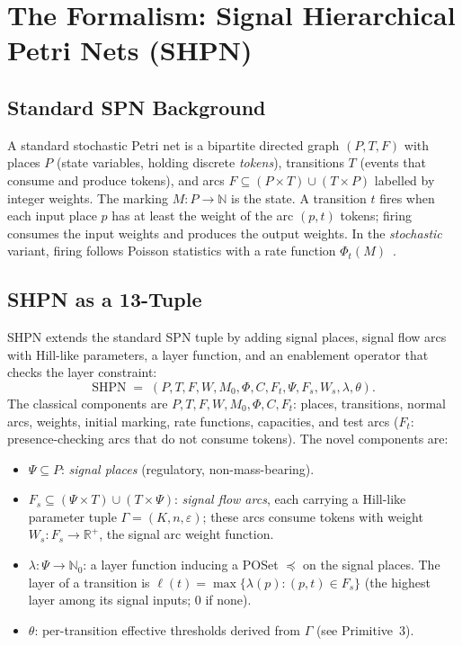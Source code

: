 \documentclass[11pt,a4paper]{article}
\begin{document}
\section{The Formalism: Signal Hierarchical Petri Nets (SHPN)}
\label{sec:formalism}

\subsection{Standard SPN Background}

A standard stochastic Petri net is a bipartite directed graph
\((P, T, F)\) with places \(P\) (state variables, holding discrete
\emph{tokens}), transitions \(T\) (events that consume and produce
tokens), and arcs \(F \subseteq (P\times T) \cup (T\times P)\) labelled
by integer weights.  The marking \(M : P \to \mathbb{N}\) is the
state.  A transition \(t\) fires when each input place \(p\) has at
least the weight of the arc \((p,t)\) tokens; firing consumes the
input weights and produces the output weights.  In the
\emph{stochastic} variant, firing follows Poisson statistics with a
rate function \(\Phi_t(M)\)~\cite{Marsan1995,Wilkinson2018}.

\subsection{SHPN as a 13-Tuple}

SHPN extends the standard SPN tuple by adding signal places, signal
flow arcs with Hill-like parameters, a layer function, and an
enablement operator that checks the layer constraint:
\begin{equation}
  \mathrm{SHPN} \;=\; (P, T, F, W, M_0, \Phi, C, F_t, \Psi, F_s, W_s,
  \lambda, \theta).
  \label{eq:13-tuple}
\end{equation}
The classical components are \(P,T,F,W,M_0,\Phi,C,F_t\): places,
transitions, normal arcs, weights, initial marking, rate functions,
capacities, and test arcs (\(F_t\): presence-checking arcs that do not
consume tokens).  The novel components are:
\begin{itemize}
\item \(\Psi \subseteq P\): \emph{signal places} (regulatory, non-mass-bearing).
\item \(F_s \subseteq (\Psi \times T) \cup (T \times \Psi)\): \emph{signal
  flow arcs}, each carrying a Hill-like parameter tuple
  \(\Gamma = (K,n,\varepsilon)\); these arcs consume tokens with weight
  \(W_s : F_s \to \mathbb{R}^{+}\), the signal arc weight function.
\item \(\lambda : \Psi \to \mathbb{N}_0\): a layer function inducing a
  POSet \(\preceq\) on the signal places.  The layer of a transition
  is \(\ell(t) = \max\{\lambda(p) : (p,t) \in F_s\}\) (the highest
  layer among its signal inputs; 0 if none).
\item \(\theta\): per-transition effective thresholds derived from
  \(\Gamma\) (see Primitive~3).
\end{itemize}
\end{document}

